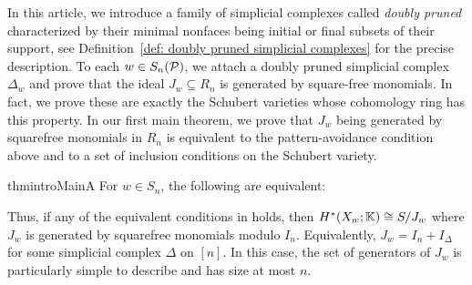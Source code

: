 In this article, we introduce a family of simplicial complexes called \emph{doubly pruned} characterized by their minimal nonfaces being initial or final subsets of their support, see Definition~\ref{def: doubly pruned simplicial complexes} for the precise description. To each $w\in S_n(\mathcal{P})$, we attach a doubly pruned simplicial complex $\Delta_w$ and prove that the ideal $J_w\subseteq R_n$ is generated by square-free monomials. In fact, we prove these are exactly the Schubert varieties whose cohomology ring has this property. In our first main theorem, we prove that $J_w$ being generated by squarefree monomials in $R_n$ is equivalent to the pattern-avoidance condition above and to a set of inclusion conditions on the Schubert variety.

\begin{restatable}{thmintro}{MainA}
\label{thm:main-A}
    For $w\in S_n$, the following are equivalent:
\end{restatable}

Thus, if any of the equivalent conditions in  holds, then $H^*(X_w;\mathbb{K})\cong S/J_w$ where $J_w$ is generated by squarefree monomials modulo $I_n$. Equivalently, $J_w = I_n +I_\Delta$ for some simplicial complex $\Delta$ on $[n]$. In this case, the set of generators of $J_w$ is particularly simple to describe and has size at most $n$.

